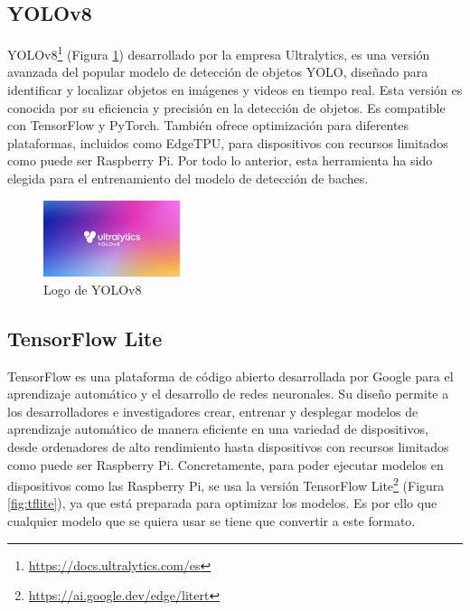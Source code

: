 
\subsection{YOLOv8}
\label{subsec:yolov8}

\acs{YOLO}v8\footnote{\url{https://docs.ultralytics.com/es}} (Figura \ref{fig:yolov8}) desarrollado por la empresa Ultralytics, es una versión avanzada del popular modelo de detección de objetos \ac{YOLO}, diseñado para identificar y localizar objetos en imágenes y videos en tiempo real. Esta versión es conocida por su eficiencia y precisión en la detección de objetos. Es compatible con TensorFlow y PyTorch. También ofrece optimización para diferentes plataformas, incluidos como EdgeTPU, para dispositivos con recursos limitados como puede ser Raspberry Pi. Por todo lo anterior, esta herramienta ha sido elegida para el entrenamiento del modelo de detección de baches. 

\begin{figure} [h!]
	\begin{center}
		\includegraphics[width=4cm]{figs/yolov8.png}
	\end{center}
	\caption{Logo de YOLOv8} %
	\label{fig:yolov8}
\end{figure}


\subsection{TensorFlow Lite}
\label{subsec:tflite}

TensorFlow es una plataforma de código abierto desarrollada por Google para el aprendizaje automático y el desarrollo de redes neuronales. Su diseño permite a los desarrolladores e investigadores crear, entrenar y desplegar modelos de aprendizaje automático de manera eficiente en una variedad de dispositivos, desde ordenadores de alto rendimiento hasta dispositivos con recursos limitados como puede ser Raspberry Pi. Concretamente, para poder ejecutar modelos en dispositivos como las Raspberry Pi, se usa la versión TensorFlow Lite\footnote{\url{https://ai.google.dev/edge/litert}} (Figura \ref{fig:tflite}), ya que está preparada para optimizar los modelos. Es por ello que cualquier modelo que se quiera usar se tiene que convertir a este formato. 

